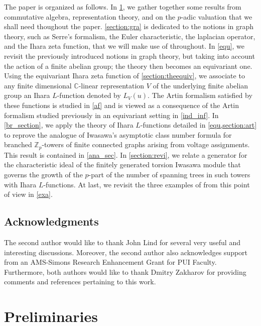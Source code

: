 \documentclass[11pt]{amsart}
\numberwithin{equation}{section}
\theoremstyle{remark}
\theoremstyle{definition}
\begin{document}
The paper is organized as follows.  In \cref{section:pre}, we gather together some results from commutative algebra, representation theory, and on the $p$-adic valuation that we shall need thoughout the paper.  \cref{section:gra} is dedicated to the notions in graph theory, such as Serre's formalism, the Euler characteristic, the laplacian operator, and the Ihara zeta function, that we will make use of throughout.  In \cref{equ}, we revisit the previously introduced notions in graph theory, but taking into account the action of a finite abelian group; the theory then becomes an equivariant one. Using the equivariant Ihara zeta function of \cref{section:theequiv}, we associate to any finite dimensional $\mathbb{C}$-linear representation $V$ of the underlying finite abelian group an Ihara $L$-function denoted by $L_{V}(u)$.  The Artin formalism satisfied by these functions is studied in \cref{af} and is viewed as a consequence of the Artin formalism studied previously in an equivariant setting in \cref{ind_inf}.  In \cref{br_section}, we apply the theory of Ihara $L$-functions detailed in \cref{equ,section:art} to reprove the analogue of Iwasawa's asymptotic class number formula for branched $\mathbb{Z}_{p}$-towers of finite connected graphs arising from voltage assignments.  This result is contained in \cref{ana_sec}.  In \cref{section:revi}, we relate a generator for the characteristic ideal of the finitely generated torsion Iwasawa module that governs the growth of the $p$-part of the number of spanning trees in such towers with Ihara $L$-functions.  At last, we revisit the three examples of \cite[\S 6]{Gambheera/Vallieres:2024} from this point of view in \cref{exa}.

    

\subsection*{Acknowledgments}
The second author would like to thank John Lind for several very useful and interesting discussions.  Moreover, the second author also acknowledges support from an AMS-Simons Research Enhancement Grant for PUI Faculty.  Furthermore, both authors would like to thank Dmitry Zakharov for providing comments and references pertaining to this work.


\section{Preliminaries} \label{section:pre}
\end{document}
